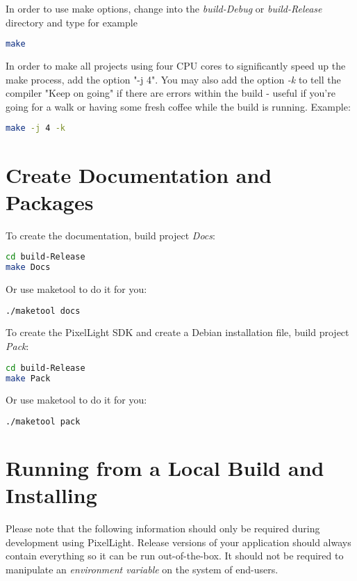 In order to use make options, change into the \emph{build-Debug} or \emph{build-Release} directory and type for example
\begin{lstlisting}[language=sh]
make
\end{lstlisting}
In order to make all projects using four \ac{CPU} cores to significantly speed up the make process, add the option "-j 4". You may also add the option \emph{-k} to tell the compiler "Keep on going" if there are errors within the build - useful if you're going for a walk or having some fresh coffee while the build is running. Example:
\begin{lstlisting}[language=sh]
make -j 4 -k
\end{lstlisting}




\section{Create Documentation and Packages}
To create the documentation, build project \emph{Docs}:
\begin{lstlisting}[language=sh]
cd build-Release
make Docs
\end{lstlisting}

Or use maketool to do it for you:
\begin{lstlisting}[language=sh]
./maketool docs
\end{lstlisting}

To create the PixelLight \ac{SDK} and create a Debian installation file, build project \emph{Pack}:
\begin{lstlisting}[language=sh]
cd build-Release
make Pack
\end{lstlisting}

Or use maketool to do it for you:
\begin{lstlisting}[language=sh]
./maketool pack
\end{lstlisting}




\section{Running from a Local Build and Installing}
Please note that the following information should only be required during development using PixelLight. Release versions of your application should always contain everything so it can be run out-of-the-box. It should not be required to manipulate an \emph{environment variable} on the system of end-users.

